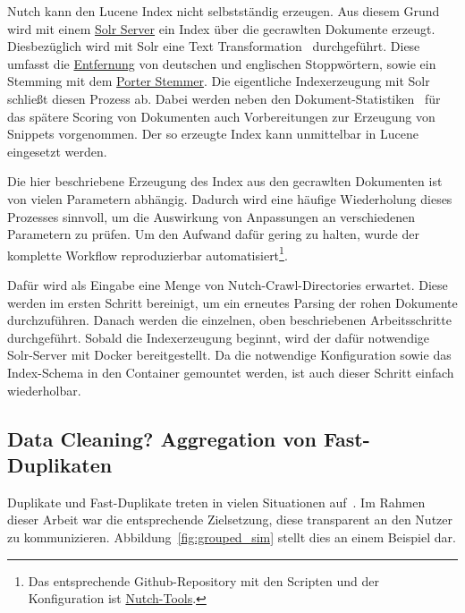 Nutch kann den Lucene Index nicht selbstständig erzeugen.
Aus diesem Grund wird mit einem \href{http://lucene.apache.org/solr/}{Solr Server} ein Index über die gecrawlten Dokumente erzeugt.
Diesbezüglich wird mit Solr eine Text Transformation~\cite{croft.chap2} durchgeführt.
Diese umfasst die \href{https://github.com/apache/lucene-solr/blob/master/lucene/analysis/common/src/java/org/apache/lucene/analysis/core/StopFilterFactory.java}
{Entfernung} von deutschen und englischen Stoppwörtern, sowie ein Stemming mit dem
\href{https://github.com/apache/lucene-solr/blob/master/lucene/analysis/common/src/java/org/apache/lucene/analysis/en/PorterStemFilterFactory.java}{Porter Stemmer}.
Die eigentliche Indexerzeugung mit Solr schließt diesen Prozess ab.
Dabei werden neben den Dokument-Statistiken~\cite{croft.chap2} für das spätere Scoring von Dokumenten auch Vorbereitungen zur Erzeugung von Snippets vorgenommen.
Der so erzeugte Index kann unmittelbar in Lucene eingesetzt werden.

Die hier beschriebene Erzeugung des Index aus den gecrawlten Dokumenten ist von vielen Parametern abhängig.
Dadurch wird eine häufige Wiederholung dieses Prozesses sinnvoll, um die Auswirkung von Anpassungen an verschiedenen Parametern zu prüfen.
Um den Aufwand dafür gering zu halten, wurde der komplette Workflow reproduzierbar automatisiert\footnote{Das
entsprechende Github-Repository mit
den Scripten und der Konfiguration ist \href{https://github.com/mam10eks/nutch_tools/}{Nutch-Tools}.}.

Dafür wird als Eingabe eine Menge von Nutch-Crawl-Directories erwartet.
Diese werden im ersten Schritt bereinigt, um ein erneutes Parsing der rohen Dokumente durchzuführen.
Danach werden die einzelnen, oben beschriebenen Arbeitsschritte durchgeführt.
Sobald die Indexerzeugung beginnt, wird der dafür notwendige Solr-Server mit Docker
bereitgestellt. Da die notwendige Konfiguration sowie das Index-Schema in den Container gemountet werden,
ist auch dieser Schritt einfach wiederholbar.

\subsection{Data Cleaning? Aggregation von Fast-Duplikaten}
\label{chap:near_duplicate_detection}

Duplikate und Fast-Duplikate treten in vielen Situationen auf~\cite{croft.chap3}.
Im Rahmen dieser Arbeit war die entsprechende Zielsetzung, diese transparent an den Nutzer zu kommunizieren.
Abbildung~\ref{fig:grouped_sim} stellt dies an einem Beispiel dar.

